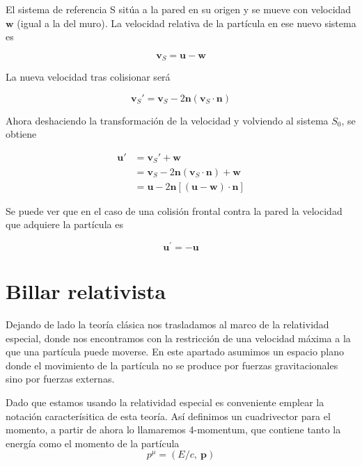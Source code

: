 \documentclass[11pt, spanish]{book}
\begin{document}
\vspace{3mm}

El sistema de referencia S sitúa a la pared en su origen y se mueve con velocidad \( \mathbf{w} \) (igual a la del muro). La velocidad relativa de la partícula en ese nuevo sistema es

\begin{equation}
    \mathbf{v}_S = \mathbf{u} - \mathbf{w}
\end{equation}

La nueva velocidad tras colisionar será

\begin{equation}
    \mathbf{v}_S' = \mathbf{v}_S - 2\mathbf{n}(\mathbf{v}_S \cdot \mathbf{n})
\end{equation}

Ahora deshaciendo la transformación de la velocidad y volviendo al sistema \( S_0 \), se obtiene

\begin{align}
    \mathbf{u}' &= \mathbf{v}_S' + \mathbf{w} \\
    &= \mathbf{v}_S - 2\mathbf{n}(\mathbf{v}_S \cdot \mathbf{n}) + \mathbf{w} \\
    &= \mathbf{u} - 2\mathbf{n}\left[(\mathbf{u} - \mathbf{w}) \cdot \mathbf{n}\right]
\end{align}

\vspace{3mm}

Se puede ver que en el caso de una colisión frontal contra la pared la velocidad que adquiere la partícula es 

\begin{equation}
    \mathbf{u}^\prime = - \mathbf{u}
    \label{eq:velocidad_inversa_clasica}
\end{equation}

\section{Billar relativista}

Dejando de lado la teoría clásica nos trasladamos al marco de la relatividad especial, donde nos encontramos con la restricción de una velocidad máxima a la que una partícula puede moverse. En este apartado asumimos un espacio plano donde el movimiento de la partícula no se produce por fuerzas gravitacionales sino por fuerzas externas. 

\vspace{3mm}

Dado que estamos usando la relatividad especial es conveniente emplear la notación caracterísitica de esta teoría. Así definimos un cuadrivector para el momento, a partir de ahora lo llamaremos 4-momentum, que contiene tanto la energía como el momento de la partícula
\begin{equation}
    p^\mu = (E/c, \: \mathbf{p})
    \label{eq:4-momentum}
\end{equation}
\end{document}
